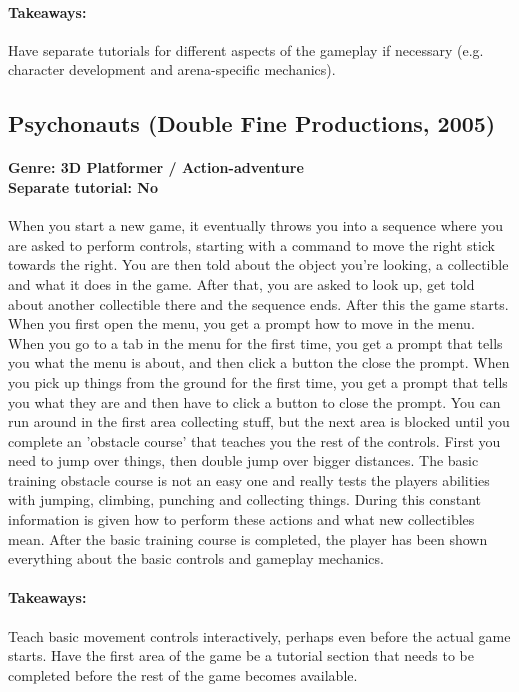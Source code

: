 \paragraph{Takeaways:}
Have separate tutorials for different aspects of the gameplay if necessary (e.g. character development and arena-specific mechanics).

\subsection{Psychonauts (Double Fine Productions, 2005)}
\paragraph{Genre: 3D Platformer / Action-adventure \\ Separate tutorial: No \\}
When you start a new game, it eventually throws you into a sequence where you are asked to perform controls, starting with a command to move the right stick towards the right. You are then told about the object you're looking, a collectible and what it does in the game. After that, you are asked to look up, get told about another collectible there and the sequence ends. After this the game starts.
When you first open the menu, you get a prompt how to move in the menu.
When you go to a tab in the menu for the first time, you get a prompt that tells you what the menu is about, and then click a button the close the prompt.
When you pick up things from the ground for the first time, you get a prompt that tells you what they are and then have to click a button to close the prompt.
You can run around in the first area collecting stuff, but the next area is blocked until you complete an 'obstacle course' that teaches you the rest of the controls.
First you need to jump over things, then double jump over bigger distances.
The basic training obstacle course is not an easy one and really tests the players abilities with jumping, climbing, punching and collecting things. During this constant information is given how to perform these actions and what new collectibles mean.
After the basic training course is completed, the player has been shown everything about the basic controls and gameplay mechanics.
\paragraph{Takeaways:}
Teach basic movement controls interactively, perhaps even before the actual game starts.
Have the first area of the game be a tutorial section that needs to be completed before the rest of the game becomes available.

